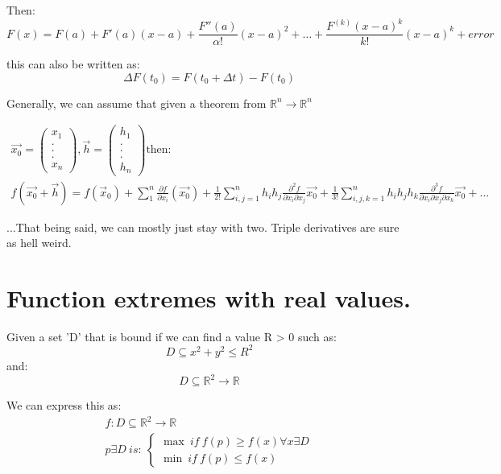 \documentclass[11pt,fleqn]{book} %
\begin{document}
Then:
\begin{equation}
    F(x) = F(a) + F'(a) (x-a) + \frac{F''(a)}{\alpha !} (x-a)^2 + \dots + \frac{F^{(k)}(x-a)^k}{k!} (x-a)^k + error    
\end{equation}

this can also be written as:
\begin{equation}
    \Delta F(t_0) = F(t_0+\Delta t) - F(t_0)
\end{equation}

Generally, we can assume that given a theorem from $\mathbb{R}^n \to \mathbb{R}^n$

\begin{gather}
    \vec{x_0} = \begin{pmatrix}
        x_1 \\
        . \\
        . \\
        . \\
        x_n
    \end{pmatrix} ,
    \vec{h} = \begin{pmatrix}
        h_1 \\
        . \\
        . \\
        . \\
        h_n
    \end{pmatrix} \text{then:} \\
    f(\vec{x_0}+ \vec{h}) = f(\vec{x}_0) + \sum_{1}^{n} \frac{\partial f}{\partial x_i}(\vec{x_0}) + \frac{1}{2!} \sum_{i,j = 1}^{n} h_i h_j \frac{\partial^2 f}{\partial x_i \partial x_j} \vec{x_0} +  
    \frac{1}{3!} \sum_{i,j,k = 1}^{n} h_i h_j h_k \frac{\partial^3 f}{\partial x_i \partial x_j \partial x_k} \vec{x_0} + \dots 
\end{gather}

...That being said, we can mostly just stay with two. Triple derivatives are sure as hell weird. 

\section{Function extremes with real values.}

Given a set 'D' that is bound if we can find a value R > 0 such as:
$$ D \subseteq x^2 + y^2 \leq R^2 $$
and:
$$ D \subseteq \mathbb{R}^2 \to \mathbb{R} $$

We can express this as:
\begin{gather}
    f: D \subseteq \mathbb{R}^2 \to \mathbb{R} \\
    p \exists D \ is: \ \begin{cases}
        \max \ if \ f(p) \geq f(x) \forall x \exists D \\
        \min \ if \ f(p) \leq f(x)   
    \end{cases}
\end{gather}
\end{document}
